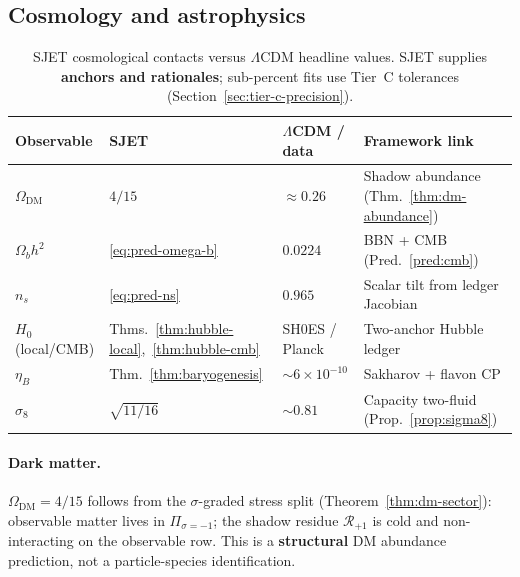 \documentclass[aps,prd,onecolumn,amsmath,amssymb,nofootinbib,11pt]{revtex4-2}
\numberwithin{equation}{section}
\theoremstyle{plain}
\theoremstyle{definition}
\theoremstyle{remark}
\begin{document}
\subsection{Cosmology and astrophysics}
\label{sec:standard-theories:cosmo}

\begin{table}[ht]
\centering
\small
\renewcommand{\arraystretch}{1.14}
\begin{tabular}{@{}llll@{}}
\toprule
\textbf{Observable} & \textbf{SJET} & \textbf{$\Lambda$CDM / data} &
\textbf{Framework link} \\
\midrule
$\Omega_{\mathrm{DM}}$ &
  $4/15$ &
  $\approx 0.26$ &
  Shadow abundance (Thm.~\ref{thm:dm-abundance}) \\
$\Omega_b h^2$ &
  \eqref{eq:pred-omega-b} &
  $0.0224$ &
  BBN + CMB (Pred.~\ref{pred:cmb}) \\
$n_s$ &
  \eqref{eq:pred-ns} &
  $0.965$ &
  Scalar tilt from ledger Jacobian \\
$H_0$ (local/CMB) &
  Thms.~\ref{thm:hubble-local},~\ref{thm:hubble-cmb} &
  SH0ES / Planck &
  Two-anchor Hubble ledger \\
$\eta_B$ &
  Thm.~\ref{thm:baryogenesis} &
  $\sim 6\times 10^{-10}$ &
  Sakharov + flavon CP \\
$\sigma_8$ &
  $\sqrt{11/16}$ &
  $\sim 0.81$ &
  Capacity two-fluid (Prop.~\ref{prop:sigma8}) \\
\bottomrule
\end{tabular}
\caption{SJET cosmological contacts versus $\Lambda$CDM headline values.
SJET supplies \textbf{anchors and rationales}; sub-percent fits use Tier~C
tolerances (Section~\ref{sec:tier-c-precision}).}
\label{tab:cosmo-bridge}
\end{table}

\paragraph{Dark matter.}
$\Omega_{\mathrm{DM}}=4/15$ follows from the $\sigma$-graded stress split
(Theorem~\ref{thm:dm-sector}): observable matter lives in
$\Pi_{\sigma=-1}$; the shadow residue $\mathcal{R}_{+1}$ is cold and
non-interacting on the observable row. This is a \textbf{structural} DM
abundance prediction, not a particle-species identification.

\end{document}
